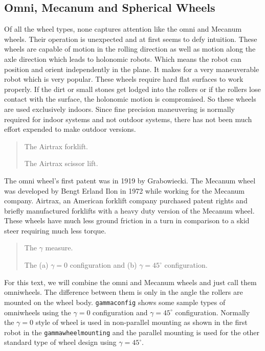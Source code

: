 \hypertarget{omni-mecanum-and-spherical-wheels}{%
\subsection{Omni, Mecanum and Spherical
Wheels}\label{omni-mecanum-and-spherical-wheels}}

Of all the wheel types, none captures attention like the omni and
Mecanum wheels. Their operation is unexpected and at first seems to defy
intuition. These wheels are capable of motion in the rolling direction
as well as motion along the axle direction which leads to holonomic
robots. Which means the robot can position and orient independently in
the plane. It makes for a very maneuverable robot which is very popular.
These wheels require hard flat surfaces to work properly. If the dirt or
small stones get lodged into the rollers or if the rollers lose contact
with the surface, the holonomic motion is compromised. So these wheels
are used exclusively indoors. Since fine precision maneuvering is
normally required for indoor systems and not outdoor systems, there has
not been much effort expended to make outdoor versions.

\begin{quote}
The Airtrax forklift.

The Airtrax scissor lift.
\end{quote}

The omni wheel's first patent was in 1919 by Grabowiecki. The Mecanum
wheel was developed by Bengt Erland Ilon in 1972 while working for the
Mecanum company. Airtrax, an American forklift company purchased patent
rights and briefly manufactured forklifts with a heavy duty version of
the Mecanum wheel. These wheels have much less ground friction in a turn
in comparison to a skid steer requiring much less torque.

\begin{quote}
The \(\gamma\) measure.

The (a) \(\gamma = 0\) configuration and (b) \(\gamma = 45^\circ\)
configuration.
\end{quote}

For this text, we will combine the omni and Mecanum wheels and just call
them omniwheels. The difference between them is only in the angle the
rollers are mounted on the wheel body. \texttt{gammaconfig} shows some
sample types of omniwheels using the \(\gamma = 0\) configuration and
\(\gamma = 45^\circ\) configuration. Normally the \(\gamma=0\) style of
wheel is used in non-parallel mounting as shown in the first robot in
the \texttt{gammawheelmounting} and the parallel mounting is used for
the other standard type of wheel design using \(\gamma = 45^\circ\).

